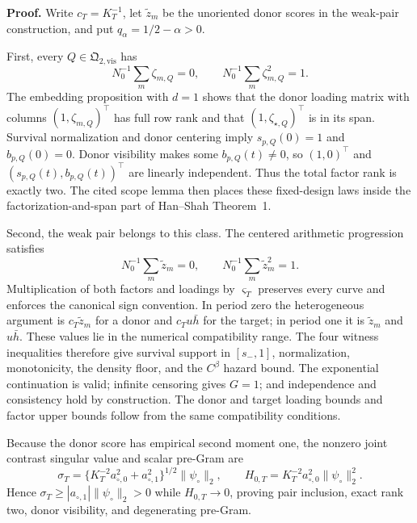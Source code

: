 \textbf{Proof.}
Write \(c_T=K_T^{-1}\), let \(\widetilde z_m\) be the unoriented donor scores in the weak-pair construction, and put \(q_\alpha=1/2-\alpha>0\).

First, every \(Q\in\mathfrak Q_{2,\mathrm{vis}}\) has
\[
 N_0^{-1}\sum_m\zeta_{m,Q}=0,
 \qquad N_0^{-1}\sum_m\zeta_{m,Q}^2=1.                 \tag{1}
\]
The embedding proposition with \(d=1\) shows that the donor loading matrix with columns \((1,\zeta_{m,Q})^\top\) has full row rank and that \((1,\zeta_{\star,Q})^\top\) is in its span. Survival normalization and donor centering imply \(s_{p,Q}(0)=1\) and \(b_{p,Q}(0)=0\). Donor visibility makes some \(b_{p,Q}(t)\ne0\), so \((1,0)^\top\) and \((s_{p,Q}(t),b_{p,Q}(t))^\top\) are linearly independent. Thus the total factor rank is exactly two. The cited scope lemma then places these fixed-design laws inside the factorization-and-span part of Han--Shah Theorem~1.

Second, the weak pair belongs to this class. The centered arithmetic progression satisfies
\[
 N_0^{-1}\sum_m\widetilde z_m=0,
 \qquad N_0^{-1}\sum_m\widetilde z_m^2=1.               \tag{2}
\]
Multiplication of both factors and loadings by \(\varsigma_T\) preserves every curve and enforces the canonical sign convention. In period zero the heterogeneous argument is \(c_T\widetilde z_m\) for a donor and \(c_Tu\bar h\) for the target; in period one it is \(\widetilde z_m\) and \(u\bar h\). These values lie in the numerical compatibility range. The four witness inequalities therefore give survival support in \([s_-,1]\), normalization, monotonicity, the density floor, and the \(C^\beta\) hazard bound. The exponential continuation is valid; infinite censoring gives \(G=1\); and independence and consistency hold by construction. The donor and target loading bounds and factor upper bounds follow from the same compatibility conditions.

Because the donor score has empirical second moment one, the nonzero joint contrast singular value and scalar pre-Gram are
\[
 \sigma_T=\{K_T^{-2}a_{\circ,0}^2+a_{\circ,1}^2\}^{1/2}
 \|\psi_\circ\|_2,
 \qquad H_{0,T}=K_T^{-2}a_{\circ,0}^2\|\psi_\circ\|_2^2. \tag{3}
\]
Hence \(\sigma_T\ge|a_{\circ,1}|\|\psi_\circ\|_2>0\) while \(H_{0,T}\to0\), proving pair inclusion, exact rank two, donor visibility, and degenerating pre-Gram.

